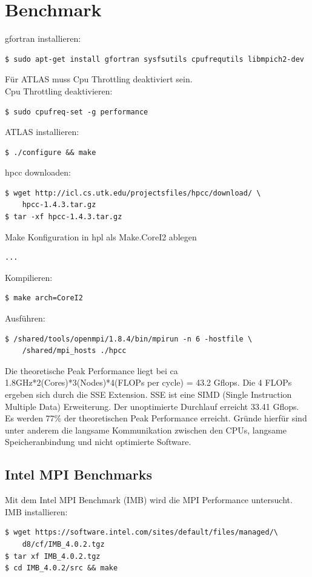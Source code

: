 \chapter{Benchmark}
gfortran installieren:
\begin{lstlisting}[style=Bash]
$ sudo apt-get install gfortran sysfsutils cpufrequtils libmpich2-dev
\end{lstlisting}
Für ATLAS muss Cpu Throttling deaktiviert sein.\\
Cpu Throttling deaktivieren: 
\begin{lstlisting}[style=Bash]
$ sudo cpufreq-set -g performance
\end{lstlisting}
ATLAS installieren:
\begin{lstlisting}[style=Bash]
$ ./configure && make
\end{lstlisting}
hpcc downloaden:
\begin{lstlisting}[style=Bash]
$ wget http://icl.cs.utk.edu/projectsfiles/hpcc/download/ \
	hpcc-1.4.3.tar.gz
$ tar -xf hpcc-1.4.3.tar.gz
\end{lstlisting}
Make Konfiguration in hpl als Make.CoreI2 ablegen
\begin{lstlisting}[style=Bash]
...
\end{lstlisting}
Kompilieren:
\begin{lstlisting}[style=Bash]
$ make arch=CoreI2
\end{lstlisting}
Ausführen:
\begin{lstlisting}[style=Bash]
$ /shared/tools/openmpi/1.8.4/bin/mpirun -n 6 -hostfile \
	/shared/mpi_hosts ./hpcc
\end{lstlisting}
Die theoretische Peak Performance liegt bei ca 1.8GHz*2(Cores)*3(Nodes)*4(FLOPs per cycle) = 43.2 Gflops.
Die 4 FLOPs ergeben sich durch die SSE Extension. SSE ist eine SIMD (Single Instruction Multiple Data) Erweiterung.
Der unoptimierte Durchlauf erreicht 33.41 Gflops. Es werden 77\% der theoretischen Peak Performance erreicht.
Gründe hierfür sind unter anderem die langsame Kommunikation zwischen den CPUs, langsame Speicheranbindung und nicht optimierte Software.\\
\section{Intel MPI Benchmarks}
Mit dem Intel MPI Benchmark (IMB) wird die MPI Performance untersucht.\\
IMB installieren:
\begin{lstlisting}[style=Bash]
$ wget https://software.intel.com/sites/default/files/managed/\
	d8/cf/IMB_4.0.2.tgz
$ tar xf IMB_4.0.2.tgz
$ cd IMB_4.0.2/src && make
\end{lstlisting}

